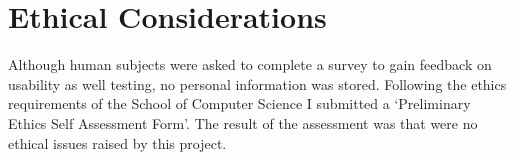 \section{Ethical Considerations}
\label{Ethical_Considerations}
Although human subjects were asked to complete a survey to gain feedback on  usability as well  testing, no personal information was stored. Following the  ethics requirements of the School of Computer Science I submitted a ‘Preliminary Ethics Self Assessment Form’. The result of the assessment was that were no  ethical issues raised by this project.



% 	
% 	
